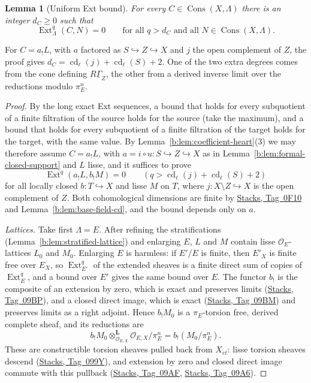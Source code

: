 \documentclass[11pt,a4paper]{article}
\numberwithin{equation}{section}
\newtheorem{lemma}[theorem]{Lemma}
\theoremstyle{definition}
\theoremstyle{remark}
\newcommand{\et}{\acute{e}t}
\newcommand{\stacks}[1]{\href{https://stacks.math.columbia.edu/tag/#1}{\textnormal{Stacks, Tag~#1}}}
\newcommand{\Ext}{\operatorname{Ext}}
\newcommand{\Cons}{\operatorname{Cons}}
\begin{document}
\begin{lemma}[Uniform Ext bound]
\label{b:lem:uniform-constructible-ext}
For every $C\in\Cons(X,\Lambda)$ there is an integer $d_C\geq0$ such that
\[
 \Ext^q_{\Lambda}(C,N)=0
 \qquad\text{for all }q>d_C\text{ and all }N\in\Cons(X,\Lambda).
\]
\end{lemma}
For $C=a_!L$, with $a$ factored as $S\hookrightarrow Z\hookrightarrow X$
and $j$ the open complement of $Z$, the proof gives
$d_C=\operatorname{cd}_\ell(j)+\operatorname{cd}_\ell(S)+2$. One of the two extra
degrees comes from the cone defining $R\underline\Gamma_Z$, the other from
a derived inverse limit over the reductions modulo $\pi_E^n$.
\begin{proof}
By the long exact Ext sequences, a bound that holds for every subquotient
of a finite filtration of the source holds for the source (take the
maximum), and a bound that holds for every subquotient of a finite
filtration of the target holds for the target, with the same value. By
Lemma~\ref{b:lem:coefficient-heart}(3) we may therefore assume
$C=a_!L$, with $a=i\circ u:S\hookrightarrow Z\hookrightarrow X$ as in
Lemma~\ref{b:lem:formal-closed-support} and $L$ lisse, and it suffices
to prove
\[
 \Ext^q(a_!L,b_!M)=0\qquad(q>\operatorname{cd}_\ell(j)+\operatorname{cd}_\ell(S)+2)
\]
for all locally closed $b:T\hookrightarrow X$ and lisse $M$ on $T$, where
$j:X\setminus Z\hookrightarrow X$ is the open complement of $Z$. Both
cohomological dimensions are finite by \stacks{0F10} and
Lemma~\ref{b:lem:base-field-cd}, and the bound depends only on $a$.

\emph{Lattices.} Take first $\Lambda=E$. After refining the
stratifications (Lemma~\ref{b:lem:stratified-lattice}) and enlarging $E$,
$L$ and $M$ contain lisse $\mathcal O_E$-lattices $L_0$ and $M_0$.
Enlarging $E$ is harmless: if $E'/E$ is finite, then $E'_X$ is finite free
over $E_X$, so $\Ext^q_{E'}$ of the extended sheaves is a finite direct sum
of copies of $\Ext^q_E$, and a bound over $E'$ gives the same bound over
$E$. The functor $b_!$ is the
composite of an extension by zero, which is exact and preserves limits
(\stacks{09BP}), and a closed direct image, which is exact
(\stacks{09BM}) and preserves limits as a right adjoint. Hence $b_!M_0$
is a $\pi_E$-torsion free, derived complete sheaf, and its reductions are
\[
 b_!M_0\otimes^{\mathbf L}_{\mathcal O_{E,X}}\mathcal O_{E,X}/\pi_E^n
 =b_!(M_0/\pi_E^n).
\]
These are constructible torsion sheaves pulled back from $X_{\et}$:
lisse torsion sheaves descend (\stacks{099Y}), and extension by zero and
closed direct image commute with this pullback (\stacks{09AF},
\stacks{09A6}).


\end{proof}
\end{document}
